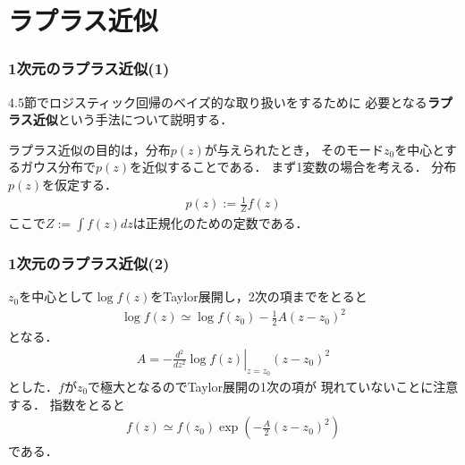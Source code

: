 \documentclass[10pt,%
hyperref={unicode}]{beamer}
\begin{document}
\section{ラプラス近似}
\begin{frame}
    \frametitle{1次元のラプラス近似(1)}
    4.5節でロジスティック回帰のベイズ的な取り扱いをするために
    必要となる\textbf{ラプラス近似}という手法について説明する．

    \bigskip

    ラプラス近似の目的は，分布$p(z)$が与えられたとき，
    そのモード$z_0$を中心とするガウス分布で$p(z)$を近似することである．
    まず1変数の場合を考える．
    分布$p(z)$を仮定する．
    \begin{align*}
        p(z) := \frac{1}{Z}f(z)
    \end{align*}
    ここで$Z := \int f(z) dz$は正規化のための定数である．
\end{frame}

\begin{frame}
    \frametitle{1次元のラプラス近似(2)}
    $z_0$を中心として$\log f(z)$をTaylor展開し，2次の項までをとると
    \begin{align}
        \log f(z) \simeq \log f(z_0) - \frac{1}{2}A (z - z_0)^2
        \tag{4.127}
    \end{align}
    となる．
    \begin{align}
        A = \left.-\frac{d^2}{dz^2}\log f(z)\right|_{z=z_0}(z - z_0)^2
        \tag{4.128}
    \end{align}
    とした．$f$が$z_0$で極大となるのでTaylor展開の1次の項が
    現れていないことに注意する．
    指数をとると
    \begin{align}
        f(z) \simeq f(z_0)\exp\left(-\frac{A}{2}(z - z_0)^2\right) \tag{4.129}
    \end{align}
    である．
\end{frame}
\end{document}
